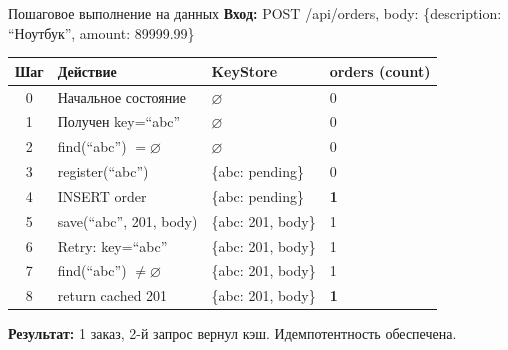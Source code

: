 \documentclass[aspectratio=169]{beamer}
\begin{document}
\begin{frame}{Пошаговое выполнение на данных}
\footnotesize
\textbf{Вход:} POST /api/orders, body: \{description: ``Ноутбук'', amount: 89999.99\}

\vspace{2mm}
\begin{tabular}{@{}clll@{}}
\toprule
\textbf{Шаг} & \textbf{Действие} & \textbf{KeyStore} & \textbf{orders (count)} \\
\midrule
0 & Начальное состояние & $\varnothing$ & 0 \\
1 & Получен key=``abc'' & $\varnothing$ & 0 \\
2 & find(``abc'') $= \varnothing$ & $\varnothing$ & 0 \\
3 & register(``abc'') & \{abc: pending\} & 0 \\
4 & INSERT order & \{abc: pending\} & \textbf{1} \\
5 & save(``abc'', 201, body) & \{abc: 201, body\} & 1 \\
\midrule
6 & Retry: key=``abc'' & \{abc: 201, body\} & 1 \\
7 & find(``abc'') $\neq \varnothing$ & \{abc: 201, body\} & 1 \\
8 & return cached 201 & \{abc: 201, body\} & \textbf{1} \\
\bottomrule
\end{tabular}

\vspace{3mm}
\textbf{Результат:} 1 заказ, 2-й запрос вернул кэш. Идемпотентность обеспечена.
\end{frame}

\end{document}
